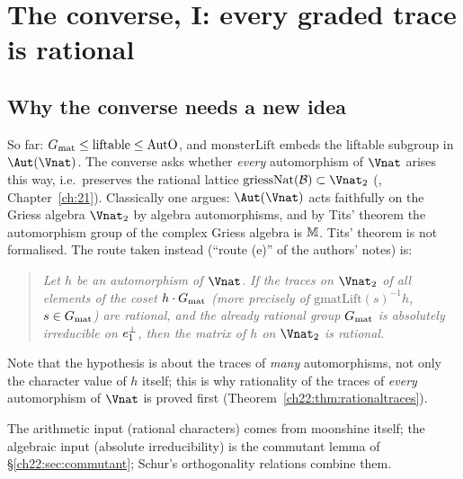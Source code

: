 \section{The converse, I: every graded trace is rational}\label{ch22:sec:traces}

\subsection{Why the converse needs a new idea}

So far: $G_{\mathrm{mat}}\le\mathrm{liftable}\le\mathrm{AutO}$, and $\mathrm{monsterLift}$ embeds the liftable subgroup
in $\Aut(\Vnat)$.  The converse asks whether \emph{every} automorphism of $\Vnat$ arises this way, i.e.\ preserves the
rational lattice $\mathrm{griessNat}(\chtwentytwoB)\subset\Vnat_2$ (,
Chapter~\ref{ch:21}).  Classically one argues: $\Aut(\Vnat)$ acts faithfully on the Griess algebra $\Vnat_2$ by algebra
automorphisms, and by Tits' theorem the automorphism group of the complex Griess algebra is $\mathbb{M}$.  Tits'
theorem is not formalised.  The route taken instead (``route (e)'' of the authors' notes) is:

\begin{quote}
\emph{Let $h$ be an automorphism of $\Vnat$.  If the traces on $\Vnat_2$ of all elements of the coset
$h\cdot G_{\mathrm{mat}}$ (more precisely of $\mathrm{gmatLift}(s)^{-1}h$, $s\in G_{\mathrm{mat}}$) are rational, and the already
rational group $G_{\mathrm{mat}}$ is absolutely irreducible on $\mathbf \mathbf{e}_1^\perp$, then the matrix of $h$ on $\Vnat_2$ is
rational.}
\end{quote}
Note that the hypothesis is about the traces of \emph{many} automorphisms, not only the character value of $h$ itself;
this is why rationality of the traces of \emph{every} automorphism of $\Vnat$ is proved first
(Theorem~\ref{ch22:thm:rationaltraces}).

The arithmetic input (rational characters) comes from moonshine itself; the algebraic input (absolute irreducibility) is
the commutant lemma of \S\ref{ch22:sec:commutant}; Schur's orthogonality relations combine them.

